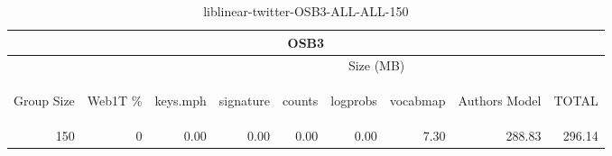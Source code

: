 \begin{center}
\begin{table}[htbp] 
 \begin{center}
\begin{tabular}{ | r | r | r | r | r | r | r | r | r |}
\hline
\multicolumn{9}{|c|}{OSB3}\\
\hline
 & & \multicolumn{7}{|c|}{Size (MB)}\\ \cline{3-9}
\begin{sideways}Group Size\end{sideways} & \begin{sideways}Web1T \% \end{sideways} & \begin{sideways}keys.mph\end{sideways} & \begin{sideways}signature\end{sideways} & \begin{sideways}counts\end{sideways} & \begin{sideways}logprobs\end{sideways} & \begin{sideways}vocabmap\end{sideways} & \begin{sideways}Authors Model \end{sideways} & \begin{sideways}TOTAL\end{sideways}\\
\hline
\multirow{0}{*}{150}
 & 0 & 0.00 & 0.00 & 0.00 & 0.00 & 7.30 & 288.83 & 296.14\\ \cline{2-9}
\hline
\end{tabular}
\caption{liblinear-twitter-OSB3-ALL-ALL-150}
\label{table:liblinear-twitter-OSB3-ALL-ALL-150}
\end{center}
 \end{table}
\end{center}

